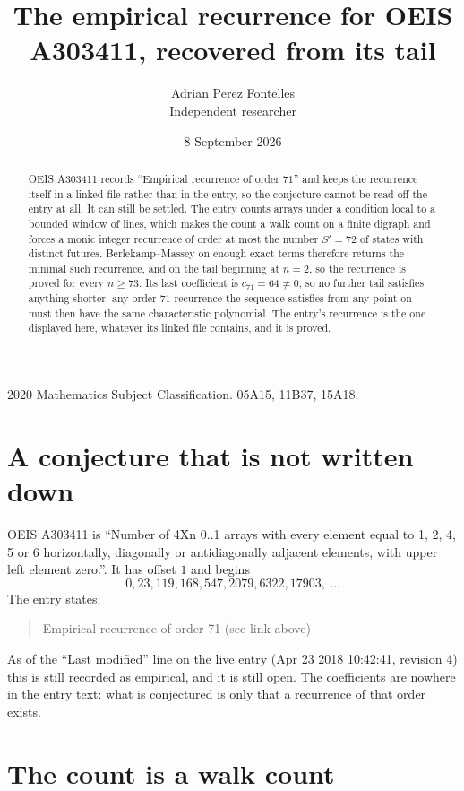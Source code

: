 \documentclass[11pt,a4paper]{article}
\title{The empirical recurrence for OEIS A303411, recovered from its tail}
\author{Adrian Perez Fontelles\\ \small Independent researcher}
\date{8 September 2026}
\theoremstyle{plain}
\theoremstyle{definition}
\begin{document}
\maketitle

\begin{abstract}
OEIS A303411 records ``Empirical recurrence of order $71$'' and keeps the recurrence itself in
a linked file rather than in the entry, so the conjecture cannot be read off the entry at all.
It can still be settled. The entry counts arrays under a condition local to a bounded window of
lines, which makes the count a walk count on a finite digraph and forces a monic integer
recurrence of order at most the number $S'=72$ of states with distinct futures. Berlekamp--Massey on
enough exact terms therefore returns the minimal such recurrence, and on the tail beginning at $n=2$, so the recurrence is proved for every $n\ge73$.
Its last coefficient is $c_{71}=64\neq0$, so no further tail satisfies anything
shorter; any order-$71$ recurrence the sequence satisfies from any point on must then have
the same characteristic polynomial. The entry's recurrence is the one displayed here, whatever
its linked file contains, and it is proved.
\end{abstract}

\noindent\small 2020 Mathematics Subject Classification. 05A15, 11B37, 15A18.\normalsize

\section{A conjecture that is not written down}

OEIS A303411 is ``Number of 4Xn 0..1 arrays with every element equal to 1, 2, 4, 5 or 6 horizontally, diagonally or antidiagonally adjacent elements, with upper left element zero.''. It has offset $1$ and begins
\[
0, 23, 119, 168, 547, 2079, 6322, 17903,\ \dots
\]
The entry states:
\begin{quote}
Empirical recurrence of order 71 (see link above)
\end{quote}
As of the ``Last modified'' line on the live entry (Apr 23 2018 10:42:41, revision 4)
this is still recorded as empirical, and it is still open. The coefficients are nowhere in the
entry text: what is conjectured is only that a recurrence of that order exists.

\section{The count is a walk count}
\end{document}
